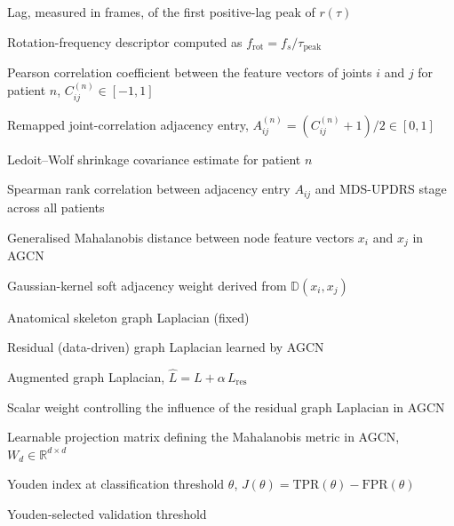 \begin{denotation}[4cm]
\item[$\tau_{\mathrm{peak}}$]{
  Lag, measured in frames, of the first positive-lag peak of $r(\tau)$
}

\item[$f_{\mathrm{rot}}$]{
  Rotation-frequency descriptor computed as $f_{\mathrm{rot}} = f_s / \tau_{\mathrm{peak}}$
}

\item[$C_{ij}^{(n)}$]{
  Pearson correlation coefficient between the feature vectors of joints $i$ and $j$ for patient $n$, $C_{ij}^{(n)} \in [-1, 1]$
}

\item[$A_{ij}^{(n)}$]{
  Remapped joint-correlation adjacency entry, $A_{ij}^{(n)} = (C_{ij}^{(n)} + 1)/2 \in [0,1]$
}

\item[$\hat{\boldsymbol{\Sigma}}^{(n)}$]{
  Ledoit--Wolf shrinkage covariance estimate for patient $n$
}

\item[$\rho_{ij}$]{
  Spearman rank correlation between adjacency entry $A_{ij}$ and MDS-UPDRS stage across all patients
}

\item[$\mathbb{D}(x_i, x_j)$]{
  Generalised Mahalanobis distance between node feature vectors $x_i$ and $x_j$ in AGCN
}

\item[$\tilde{A}_{ij}$]{
  Gaussian-kernel soft adjacency weight derived from $\mathbb{D}(x_i, x_j)$
}

\item[$L$]{
  Anatomical skeleton graph Laplacian (fixed)
}

\item[$L_{\mathrm{res}}$]{
  Residual (data-driven) graph Laplacian learned by AGCN
}

\item[$\hat{L}$]{
  Augmented graph Laplacian, $\hat{L} = L + \alpha\, L_{\mathrm{res}}$
}

\item[$\alpha$]{
  Scalar weight controlling the influence of the residual graph Laplacian in AGCN
}

\item[$W_d$]{
  Learnable projection matrix defining the Mahalanobis metric in AGCN, $W_d \in \mathbb{R}^{d \times d}$
}

\item[$J(\theta)$]{
  Youden index at classification threshold $\theta$, $J(\theta) = \mathrm{TPR}(\theta) - \mathrm{FPR}(\theta)$
}

\item[$\theta^{*}$]{
  Youden-selected validation threshold
}

\end{denotation}
